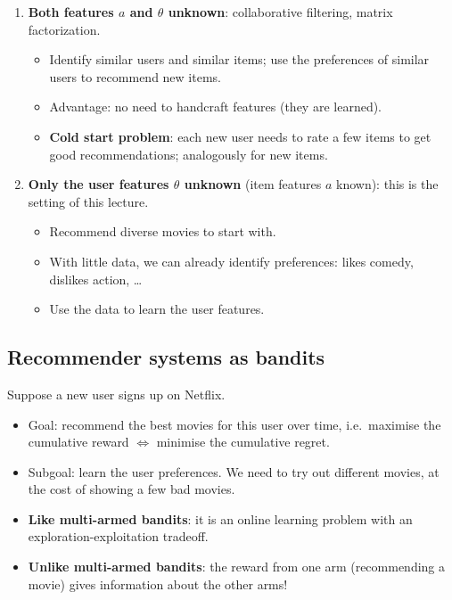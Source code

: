 \begin{enumerate}
    \item \textbf{Both features $a$ and $\theta$ unknown}: collaborative filtering, matrix factorization.
    \begin{itemize}
        \item Identify similar users and similar items; use the preferences of similar users to recommend new items.
        \item Advantage: no need to handcraft features (they are learned).
        \item \textbf{Cold start problem}: each new user needs to rate a few items to get good recommendations; analogously for new items.
    \end{itemize}
    \item \textbf{Only the user features $\theta$ unknown} (item features $a$ known): this is the setting of this lecture.
    \begin{itemize}
        \item Recommend diverse movies to start with.
        \item With little data, we can already identify preferences: likes comedy, dislikes action, \dots
        \item Use the data to learn the user features.
    \end{itemize}
\end{enumerate}

\subsection{Recommender systems as bandits}

Suppose a new user signs up on Netflix.
\begin{itemize}
    \item Goal: recommend the best movies for this user over time, i.e.\ maximise the cumulative reward $\Leftrightarrow$ minimise the cumulative regret.
    \item Subgoal: learn the user preferences. We need to try out different movies, at the cost of showing a few bad movies.
    \item \textbf{Like multi-armed bandits}: it is an online learning problem with an exploration-exploitation tradeoff.
    \item \textbf{Unlike multi-armed bandits}: the reward from one arm (recommending a movie) gives information about the other arms!
\end{itemize}

